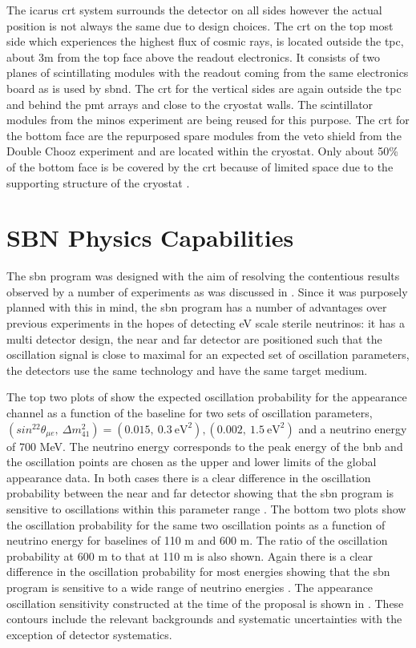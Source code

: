 The \gls{icarus} \gls{crt} system surrounds the detector on all sides however the actual position is not always the same due to design choices. The \gls{crt} on the top most side which experiences the highest flux of cosmic rays, is located outside the \gls{tpc}, about 3m from the top face above the readout electronics. It consists of two planes of scintillating modules with the readout coming from the same electronics board as is used by \gls{sbnd}.
The \gls{crt} for the vertical sides are again outside the \gls{tpc} and behind the \gls{pmt} arrays and close to the cryostat walls. The scintillator modules from the \gls{minos} experiment are being reused for this purpose. The \gls{crt} for the bottom face are the repurposed spare modules from the veto shield from the Double Chooz experiment and are located within the cryostat. Only about 50\% of the bottom face is be covered by the \gls{crt} because of limited space due to the supporting structure of the cryostat \cite{SBN_Proposal}\cite{ICARUS_CRT}.

\section{SBN Physics Capabilities}

The \gls{sbn} program was designed with the aim of resolving the contentious results observed by a number of experiments as was discussed in . Since it was purposely planned with this in mind, the \gls{sbn} program has a number of advantages over previous experiments in the hopes of detecting eV scale sterile neutrinos: it has a multi detector design, the near and far detector are positioned such that the oscillation signal is close to maximal for an expected set of oscillation parameters, the detectors use the same technology and have the same target medium. 

The top two plots of  show the expected oscillation probability for the \nue appearance channel as a function of the baseline for two sets of oscillation parameters, $(sin^22\theta_{\mu e}, ~\Delta m^2_{41}) = (0.015, ~0.3~\text{eV}^2), (0.002, ~1.5~\text{eV}^2)$ and a neutrino energy of 700 MeV. The neutrino energy corresponds to the peak energy of the \gls{bnb} and the oscillation points are chosen as the upper and lower limits of the global \nue appearance data. In both cases there is a clear difference in the oscillation probability between the near and far detector showing that the \gls{sbn} program is sensitive to oscillations within this parameter range \cite{SBN_paper}. The bottom two plots show the oscillation probability for the same two oscillation points as a function of neutrino energy for baselines of 110 m and 600 m. The ratio of the oscillation probability at 600 m to that at 110 m is also shown. Again there is a clear difference in the oscillation probability for most energies showing that the \gls{sbn} program is sensitive to a wide range of neutrino energies \cite{SBN_paper}. The \nue appearance oscillation sensitivity constructed at the time of the proposal is shown in . These contours include the relevant backgrounds and systematic uncertainties with the exception of detector systematics. 

